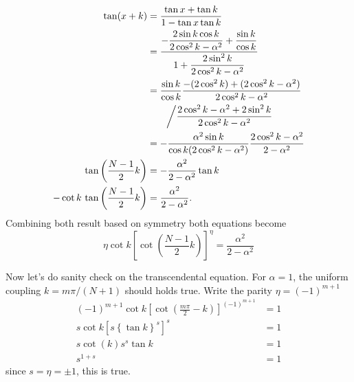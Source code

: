 \documentclass[../../../main.tex]{subfiles}
\begin{document}
\begin{align*}
  \tan(x+k)                                 & =  \frac{\tan x+\tan k} {1-\tan x\tan k}                                                                                \\
                                            & =  \frac{ -\dfrac{2\sin k\cos k}{2\cos^2k-\alpha^2} +\dfrac{\sin k}{\cos k} }{ 1+ \dfrac{2\sin^2k}{2\cos^2k-\alpha^2} } \\
                                            & = \frac{\sin k}{\cos k} \frac{ -(2\cos^2k)+(2\cos^2k-\alpha^2) }{ 2\cos^2k-\alpha^2 }                                   \\
                                            & \qquad\bigg\slash\frac{ 2\cos^2k-\alpha^2+2\sin^2k }{ 2\cos^2k-\alpha^2 }                                               \\
                                            & =  -\frac{\alpha^2\sin k} {\cos k(2\cos^2k-\alpha^2)}\frac{2\cos^2k-\alpha^2}{2-\alpha^2}                               \\
  \tan\left(\frac{N-1}{2}k\right)
                                            & = -\frac{\alpha^2}{2-\alpha^2}\tan k                                                                                    \\
  -\cot k\, \tan\left(\frac{N-1}{2}k\right) & =  \frac{\alpha^2}{2-\alpha^2}.
\end{align*}
Combining both result based on symmetry
both equations become
\begin{equation*}
  \eta\cot k \left[ \cot\left(\frac{N-1}{2}k\right) \right]^\eta  = \frac{\alpha^2}{2-\alpha^2}
\end{equation*}

Now let's do sanity check on the transcendental equation.
For $\alpha=1$, the uniform coupling $k = m\pi/(N+1)$ should holds true.
Write the parity $\eta = (-1)^{m+1}$
\begin{align*}
  (-1)^{m+1}\cot k \left[ \cot\left(\frac{m\pi}{2}-k\right) \right]^{(-1)^{m+1}}
                                                           & = 1 \\
  s\cot k \left[ s\left\{ \tan k \right\}^{s}  \right]^{s} & = 1 \\
  s\cot (k) s^s \tan k                                     & = 1 \\
  s^{1+s}                                                  & = 1
\end{align*}
since $s=\eta = \pm1$, this is true.
\end{document}
